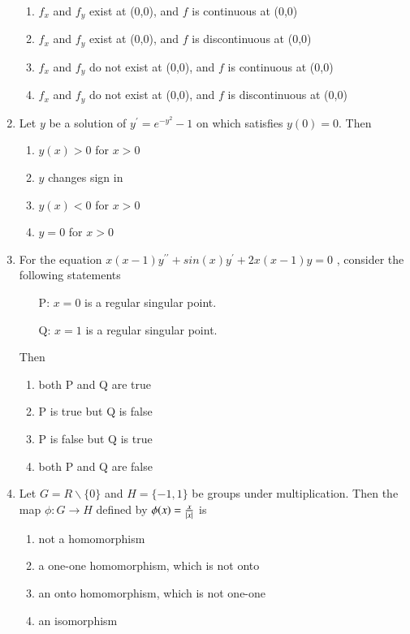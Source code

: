 \documentclass[journal]{IEEEtran}
\begin{document}
\begin{enumerate}
{\begin{enumerate}
    \item $f_x$ and $f_y$ exist at (0,0), and $f$ is continuous at (0,0) 
    \item $f_x$ and $f_y$ exist at (0,0), and $f$ is discontinuous at (0,0)
    \item $f_x$ and $f_y$ do not exist at (0,0), and $f$ is continuous at (0,0)
    \item $f_x$ and $f_y$ do not exist at (0,0), and $f$ is discontinuous at (0,0)
\end{enumerate}
}

\item { Let $y$ be a solution of $y^\prime=e^{-y^2}-1$ on  which satisfies $y(0) = 0$. Then
\begin{multicols}{2}
\begin{enumerate}
    \item $y(x)>0$ for $x>0$
    \item $y$ changes sign in 
    \item $y(x) <0$ for $x>0 $
    \item $y=0$ for $x>0$
\end{enumerate}
\end{multicols}
}

\item{ For the equation $x(x-1)y^{\prime\prime}+sin(x)y^\prime+2x(x-1)y=0$ , consider the following statements 
    \begin{itemize}
        \item[P:] $x=0$ is a regular singular point. 
        \item[Q:] $x=1$ is a regular singular point.
    \end{itemize}
    
Then
\begin{multicols}{2}
\begin{enumerate}
    \item both P and Q are true
    \item P is true but Q is false
    \item P is false but Q is true
    \item both P and Q are false
\end{enumerate}
\end{multicols}
}

\item{ Let $G = R \backslash \{0\}$ and $H=\{-1, 1\}$ be groups under multiplication. Then the map $\phi: G \rightarrow H$ defined by $\phi(x) = \frac{x}{\left\vert x\right\vert}$ is
\begin{enumerate}
    \item not a homomorphism
    \item a one-one homomorphism, which is not onto 
    \item an onto homomorphism, which is not one-one 
    \item an isomorphism
\end{enumerate}
}




\end{enumerate}
\end{document}

